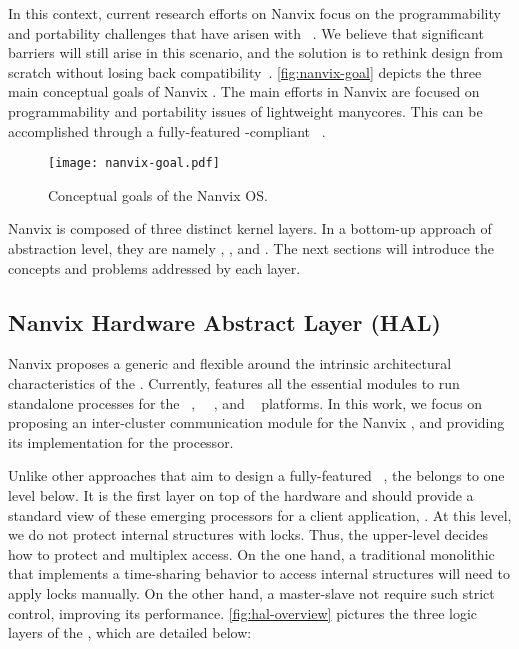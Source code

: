 	In this context, current research efforts on Nanvix \os focus on the
	programmability and portability	challenges that have arisen with
	\lightweight \manycores~\cite{christgau2017, gamell2012, serres2011}.
	We believe that significant barriers will still arise in this scenario, and
	the solution is to rethink \os design from scratch without losing back
	compatibility~\cite{penna:compas19, penna2019}.
	\autoref{fig:nanvix-goal} depicts the three main conceptual goals of Nanvix \os.
	The main efforts in Nanvix \os are focused on programmability and portability
	issues of lightweight manycores. This can be accomplished through a fully-featured
	\posix-compliant \os~\cite{penna:compas19}.

	\begin{figure}[!tb]
		\centering%
		\caption{Conceptual goals of the Nanvix OS.}%
		\label{fig:nanvix-goal}%
		\texttt{[image: nanvix-goal.pdf]}%
	\end{figure}

	Nanvix \os is composed of three distinct kernel layers.
	In a bottom-up approach of abstraction level, they are namely \nanvix \hal,
	\nanvix \microkernel, and \nanvix \multikernel.
	The next sections will introduce the concepts and problems addressed by
	each layer.

	\subsection{Nanvix Hardware Abstract Layer (HAL)}
	\label{sec.hal}

		Nanvix \os proposes a generic and flexible \hal around the
		intrinsic architectural characteristics of the \lightweight \manycores.
		Currently, \hal features all the essential modules to run standalone
		processes for the \mppa~\cite{DeDinechin2013-1}, \optimsoc~~\cite{Wallentowitz2013},
		and \hero~\cite{Kurth2017} platforms.
		In this work, we focus on proposing an inter-cluster communication module
		for the Nanvix \hal, and providing its implementation for the \mppa processor.

		Unlike other approaches that aim to design a fully-featured \os~\cite{Baumann2009,kluge2014,nightingale2009,rhoden2011},
		the \hal belongs to one level below.
		It is the first layer on top of the hardware and should provide a standard
		view of these emerging processors for a client application, \eg \os.
		At this level, we do not protect internal structures with locks.
		Thus, the upper-level decides how to protect and multiplex \hal access.
		On the one hand, a traditional monolithic \os that implements a time-sharing
		behavior to access internal structures will need to apply locks manually.
		On the other hand, a master-slave \os not require such strict control,
		improving its performance.
		\autoref{fig:hal-overview} pictures the three logic layers of the \hal, which are
		detailed below:

